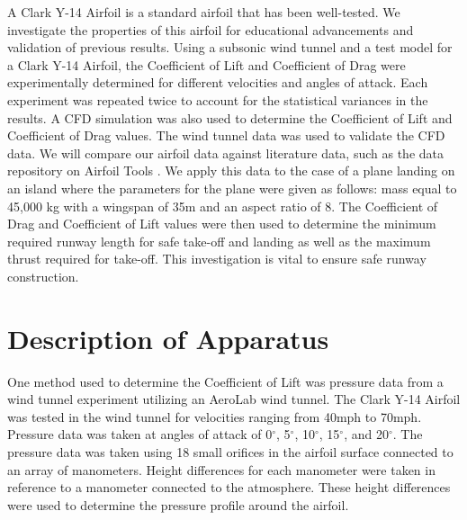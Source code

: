 \documentclass[
	12pt, %
]{fluids_report_style}
\begin{document}
A Clark Y-14 Airfoil is a standard airfoil that has been well-tested. We investigate the properties of this airfoil for educational advancements and validation of previous results. Using a subsonic wind tunnel and a test model for a Clark Y-14 Airfoil, the Coefficient of Lift and Coefficient of Drag were experimentally determined for different velocities and angles of attack. Each experiment was repeated twice to account for the statistical variances in the results. A CFD simulation was also used to determine the Coefficient of Lift and Coefficient of Drag values. The wind tunnel data was used to validate the CFD data. We will compare our airfoil data against literature data, such as the data repository on Airfoil Tools \cite{clark_y_airfoil}. We apply this data to the case of a plane landing on an island where the parameters for the plane were given as follows: mass equal to 45,000 kg with a wingspan of 35m and an aspect ratio of 8. The Coefficient of Drag and Coefficient of Lift values were then used to determine the minimum required runway length for safe take-off and landing as well as the maximum thrust required for take-off. This investigation is vital to ensure safe runway construction.

\section{Description of Apparatus}

One method used to determine the Coefficient of Lift was pressure data from a wind tunnel experiment utilizing an AeroLab wind tunnel. The Clark Y-14 Airfoil was tested in the wind tunnel for velocities ranging from 40mph to 70mph. Pressure data was taken at angles of attack of 0$^\circ$, 5$^\circ$, 10$^\circ$, 15$^\circ$, and 20$^\circ$. The pressure data was taken using 18 small orifices in the airfoil surface connected to an array of manometers. Height differences for each manometer were taken in reference to a manometer connected to the atmosphere. These height differences were used to determine the pressure profile around the airfoil. 
\end{document}
